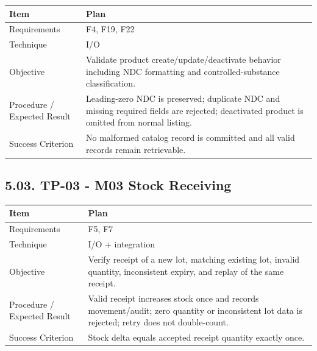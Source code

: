 {\def\LTcaptype{none} %
\begin{longtable}[]{|
  >{\raggedright\arraybackslash}m{}|
  >{\raggedright\arraybackslash}m{}|}
\hline
\begin{minipage}[c]{\linewidth}\raggedright
\textbf{Item}
\end{minipage} & \begin{minipage}[c]{\linewidth}\raggedright
\textbf{Plan}
\end{minipage} \\
\hline
\endhead

\endlastfoot
Requirements & F4, F19, F22 \\ \hline
Technique & I/O \\ \hline
Objective & Validate product create/update/deactivate behavior including NDC formatting and controlled-substance classification. \\ \hline
Procedure / Expected Result & Leading-zero NDC is preserved; duplicate NDC and missing required fields are rejected; deactivated product is omitted from normal listing. \\ \hline
Success Criterion & No malformed catalog record is committed and all valid records remain retrievable. \\ \hline
\end{longtable}
}

\subsection{5.03. TP-03 - M03 Stock Receiving}\label{tp-03---m03-stock-receiving}

{\def\LTcaptype{none} %
\begin{longtable}[]{|
  >{\raggedright\arraybackslash}m{}|
  >{\raggedright\arraybackslash}m{}|}
\hline
\begin{minipage}[c]{\linewidth}\raggedright
\textbf{Item}
\end{minipage} & \begin{minipage}[c]{\linewidth}\raggedright
\textbf{Plan}
\end{minipage} \\
\hline
\endhead

\endlastfoot
Requirements & F5, F7 \\ \hline
Technique & I/O + integration \\ \hline
Objective & Verify receipt of a new lot, matching existing lot, invalid quantity, inconsistent expiry, and replay of the same receipt. \\ \hline
Procedure / Expected Result & Valid receipt increases stock once and records movement/audit; zero quantity or inconsistent lot data is rejected; retry does not double-count. \\ \hline
Success Criterion & Stock delta equals accepted receipt quantity exactly once. \\ \hline
\end{longtable}
}

